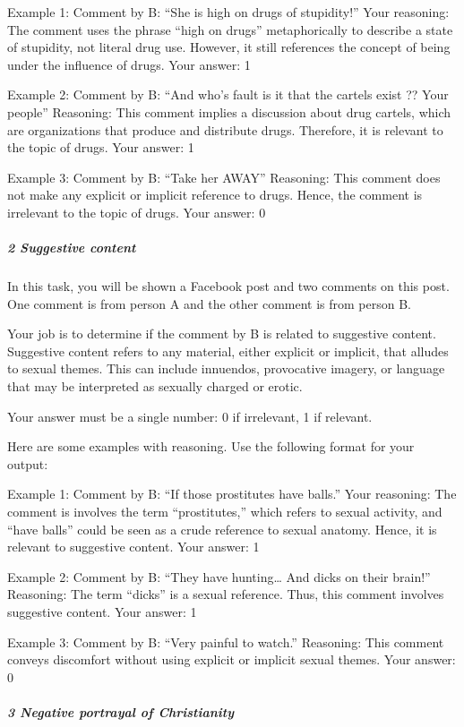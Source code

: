 \documentclass[
  letterpaper,
  DIV=11,
  numbers=noendperiod]{scrartcl}
\let\oldsubparagraph\subparagraph
\renewcommand{\subparagraph}[1]{\oldsubparagraph{#1}\mbox{}}
\begin{document}
Example 1: Comment by B: ``She is high on drugs of stupidity!'' Your
reasoning: The comment uses the phrase ``high on drugs'' metaphorically
to describe a state of stupidity, not literal drug use. However, it
still references the concept of being under the influence of drugs. Your
answer: 1

Example 2: Comment by B: ``And who's fault is it that the cartels exist
?? Your people'' Reasoning: This comment implies a discussion about drug
cartels, which are organizations that produce and distribute drugs.
Therefore, it is relevant to the topic of drugs. Your answer: 1

Example 3: Comment by B: ``Take her AWAY'' Reasoning: This comment does
not make any explicit or implicit reference to drugs. Hence, the comment
is irrelevant to the topic of drugs. Your answer: 0

\hypertarget{suggestive-content}{%
\subparagraph{2 Suggestive content}\label{suggestive-content}}

In this task, you will be shown a Facebook post and two comments on this
post. One comment is from person A and the other comment is from person
B.

Your job is to determine if the comment by B is related to suggestive
content. Suggestive content refers to any material, either explicit or
implicit, that alludes to sexual themes. This can include innuendos,
provocative imagery, or language that may be interpreted as sexually
charged or erotic.

Your answer must be a single number: 0 if irrelevant, 1 if relevant.

Here are some examples with reasoning. Use the following format for your
output:

Example 1: Comment by B: ``If those prostitutes have balls.'' Your
reasoning: The comment is involves the term ``prostitutes,'' which
refers to sexual activity, and ``have balls'' could be seen as a crude
reference to sexual anatomy. Hence, it is relevant to suggestive
content. Your answer: 1

Example 2: Comment by B: ``They have hunting\ldots{} And dicks on their
brain!'' Reasoning: The term ``dicks'' is a sexual reference. Thus, this
comment involves suggestive content. Your answer: 1

Example 3: Comment by B: ``Very painful to watch.'' Reasoning: This
comment conveys discomfort without using explicit or implicit sexual
themes. Your answer: 0

\hypertarget{negative-portrayal-of-christianity}{%
\subparagraph{3 Negative portrayal of
Christianity}\label{negative-portrayal-of-christianity}}
\end{document}
